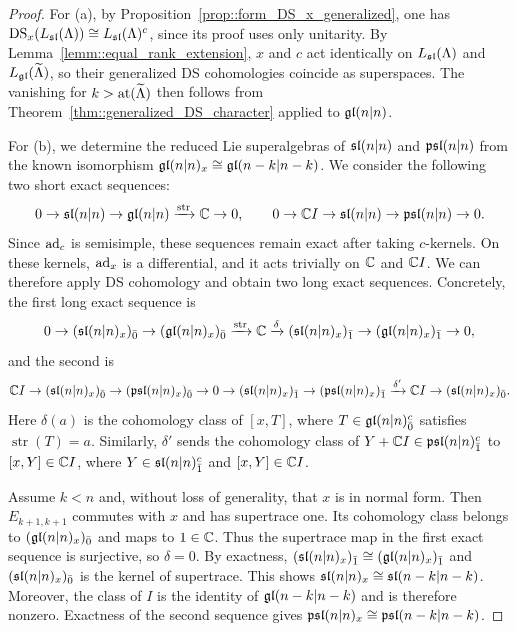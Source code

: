 \begin{proof}

For (a), by Proposition~\ref{prop::form_DS_x_generalized}, one has $\DS_x(L_{\sl}(\Lambda))\cong L_{\sl}(\Lambda)^c$, since its proof uses only unitarity. By Lemma~\ref{lemm::equal_rank_extension}, $x$ and $c$ act identically on $L_{\sl}(\Lambda)$ and $L_{\gl}(\widetilde\Lambda)$, so their generalized DS cohomologies coincide as superspaces. The vanishing for $k>\at(\widetilde\Lambda)$ then follows from Theorem~\ref{thm::generalized_DS_character} applied to $\gl(n\vert n)$.


For (b), we determine the reduced Lie superalgebras of $\sl(n\vert n)$ and $\psl(n\vert n)$ from the known isomorphism $\gl(n\vert n)_x\cong\gl(n-k\vert n-k)$. We consider the following two short exact sequences:
\[
0\to\sl(n\vert n)\to\gl(n\vert n)\xrightarrow{\operatorname{str}}\CC\to0,
\qquad
0\to\CC I\to\sl(n\vert n)\to\psl(n\vert n)\to0.
\]
Since $\ad_c$ is semisimple, these sequences remain exact after taking $c$-kernels. On these kernels, $\ad_x$ is a differential, and it acts trivially on $\CC$ and $\CC I$. We can therefore apply DS cohomology and obtain two long exact sequences. Concretely, the first long exact sequence is
\[
0\to(\sl(n\vert n)_x)_{\bar0}\to(\gl(n\vert n)_x)_{\bar0}\xrightarrow{\operatorname{str}}\CC\xrightarrow{\delta}(\sl(n\vert n)_x)_{\bar1}\to(\gl(n\vert n)_x)_{\bar1}\to0,
\]
and the second is
\[
\CC I\to(\sl(n\vert n)_x)_{\bar0}\to(\psl(n\vert n)_x)_{\bar0}\to0\to(\sl(n\vert n)_x)_{\bar1}\to(\psl(n\vert n)_x)_{\bar1}\xrightarrow{\delta'}\CC I\to(\sl(n\vert n)_x)_{\bar0}.
\]
Here $\delta(a)$ is the cohomology class of $[x,T]$, where $T\in\gl(n\vert n)^c_{\bar0}$ satisfies $\operatorname{str}(T)=a$. Similarly, $\delta'$ sends the cohomology class of $Y+\CC I\in\psl(n\vert n)^c_{\bar1}$ to $[x,Y]\in\CC I$, where $Y\in\sl(n\vert n)^c_{\bar1}$ and $[x,Y]\in\CC I$.

Assume $k<n$ and, without loss of generality, that $x$ is in normal form. Then $E_{k+1,k+1}$ commutes with $x$ and has supertrace one. Its cohomology class belongs to $(\gl(n\vert n)_x)_{\bar0}$ and maps to $1\in\CC$. Thus the supertrace map in the first exact sequence is surjective, so $\delta=0$. By exactness, $(\sl(n\vert n)_x)_{\bar1}\cong(\gl(n\vert n)_x)_{\bar1}$ and $(\sl(n\vert n)_x)_{\bar0}$ is the kernel of supertrace. This shows $\sl(n\vert n)_{x}\cong \sl(n-k\vert n-k)$. Moreover, the class of $I$ is the identity of $\gl(n-k\vert n-k)$ and is therefore nonzero. Exactness of the second sequence gives $\psl(n\vert n)_x\cong\psl(n-k\vert n-k)$.


\end{proof}
